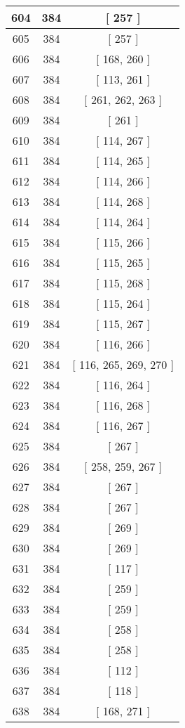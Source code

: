 \begin{center}
\begin{longtable}[H]{|| c c c ||}
\hline
604 & 384 & [ 257 ] \\ 
\hline
605 & 384 & [ 257 ] \\ 
\hline
606 & 384 & [ 168, 260 ] \\ 
\hline
607 & 384 & [ 113, 261 ] \\ 
\hline
608 & 384 & [ 261, 262, 263 ] \\ 
\hline
609 & 384 & [ 261 ] \\ 
\hline
610 & 384 & [ 114, 267 ] \\ 
\hline
611 & 384 & [ 114, 265 ] \\ 
\hline
612 & 384 & [ 114, 266 ] \\ 
\hline
613 & 384 & [ 114, 268 ] \\ 
\hline
614 & 384 & [ 114, 264 ] \\ 
\hline
615 & 384 & [ 115, 266 ] \\ 
\hline
616 & 384 & [ 115, 265 ] \\ 
\hline
617 & 384 & [ 115, 268 ] \\ 
\hline
618 & 384 & [ 115, 264 ] \\ 
\hline
619 & 384 & [ 115, 267 ] \\ 
\hline
620 & 384 & [ 116, 266 ] \\ 
\hline
621 & 384 & [ 116, 265, 269, 270 ] \\ 
\hline
622 & 384 & [ 116, 264 ] \\ 
\hline
623 & 384 & [ 116, 268 ] \\ 
\hline
624 & 384 & [ 116, 267 ] \\ 
\hline
625 & 384 & [ 267 ] \\ 
\hline
626 & 384 & [ 258, 259, 267 ] \\ 
\hline
627 & 384 & [ 267 ] \\ 
\hline
628 & 384 & [ 267 ] \\ 
\hline
629 & 384 & [ 269 ] \\ 
\hline
630 & 384 & [ 269 ] \\ 
\hline
631 & 384 & [ 117 ] \\ 
\hline
632 & 384 & [ 259 ] \\ 
\hline
633 & 384 & [ 259 ] \\ 
\hline
634 & 384 & [ 258 ] \\ 
\hline
635 & 384 & [ 258 ] \\ 
\hline
636 & 384 & [ 112 ] \\ 
\hline
637 & 384 & [ 118 ] \\ 
\hline
638 & 384 & [ 168, 271 ] \\ 

\end{longtable}
\end{center}
